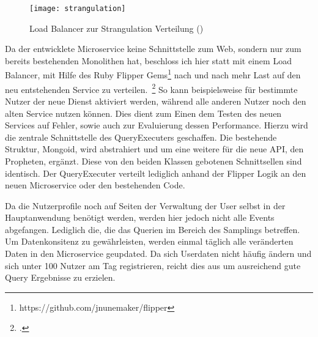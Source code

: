 \begin{figure}[h]
    \caption{Load Balancer zur Strangulation Verteilung (\cite{Hammant:Strangler})}
    \texttt{[image: strangulation]}
\end{figure}

Da der entwicklete Microservice keine Schnittstelle zum Web, sondern nur zum bereits bestehenden Monolithen hat, beschloss ich hier statt mit einem Load Balancer, mit Hilfe des Ruby Flipper Gems\footnote{https://github.com/jnunemaker/flipper} nach und nach mehr Last auf den neu entstehenden Service zu verteilen.~\footcite[vgl.][]{Hammant:Strangler} So kann beispielsweise für bestimmte Nutzer der neue Dienst aktiviert werden, während alle anderen Nutzer noch den alten Service nutzen können. Dies dient zum Einen dem Testen des neuen Services auf Fehler, sowie auch zur Evaluierung dessen Performance.
Hierzu wird die zentrale Schnittstelle des QueryExecuters geschaffen. Die bestehende Struktur, Mongoid, wird abstrahiert und um eine weitere für die neue API, den Propheten, ergänzt. Diese von den beiden Klassen gebotenen Schnittsellen sind identisch. Der QueryExecuter verteilt lediglich anhand der Flipper Logik an den neuen Microservice oder den bestehenden Code.

Da die Nutzerprofile noch auf Seiten der Verwaltung der User selbst in der Hauptanwendung benötigt werden, werden hier jedoch nicht alle Events abgefangen. Lediglich die, die das Querien im Bereich des Samplings betreffen. Um Datenkonsitenz zu gewährleisten, werden einmal täglich alle veränderten Daten in den Microservice geupdated. Da sich Userdaten nicht häufig ändern und sich unter 100 Nutzer am Tag registrieren, reicht dies aus um ausreichend gute Query Ergebnisse zu erzielen.